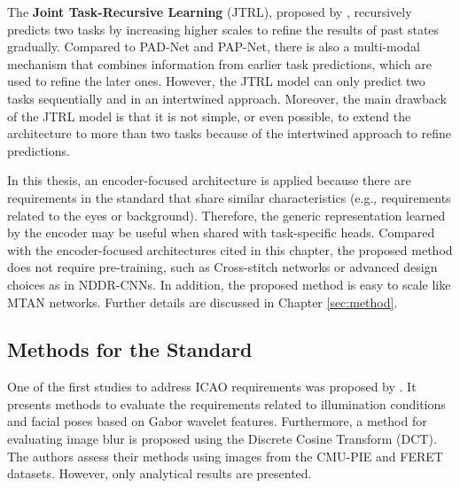 The \textbf{Joint Task-Recursive Learning} (JTRL), proposed by \cite{zhang2018joint}, recursively predicts two tasks by increasing higher scales to refine the results of past states gradually. Compared to PAD-Net and PAP-Net, there is also a multi-modal mechanism that combines information from earlier task predictions, which are used to refine the later ones. However, the JTRL model can only predict two tasks sequentially and in an intertwined approach. Moreover, the main drawback of the JTRL model is that it is not simple, or even possible, to extend the architecture to more than two tasks because of the intertwined approach to refine predictions.
 
In this thesis, an encoder-focused architecture is applied because there are requirements in the \icao standard that share similar characteristics (e.g., requirements related to the eyes or background). Therefore, the generic representation learned by the encoder may be useful when shared with task-specific heads. Compared with the encoder-focused architectures cited in this chapter, the proposed method does not require pre-training, such as Cross-stitch networks or advanced design choices as in NDDR-CNNs. In addition, the proposed method is easy to scale like MTAN networks. Further details are discussed in Chapter \ref{sec:method}.
 
\subsection{Methods for the \icao Standard}
 
One of the first studies to address ICAO requirements was proposed by \citet{sang2009face}. It presents methods to evaluate the requirements related to illumination conditions and facial poses based on Gabor wavelet features. Furthermore, a method for evaluating image blur is proposed using the Discrete Cosine Transform (DCT). The authors assess their methods using images from the CMU-PIE and FERET datasets. However, only analytical results are presented.
 
